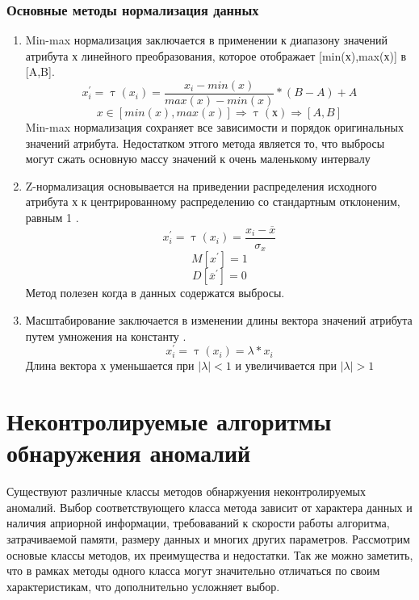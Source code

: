 \subsubsection{Основные методы нормализация данных}
\begin{enumerate}
	\item Min-max нормализация заключается в применении к диапазону значений атрибута х линейного преобразования, которое отображает [min(х),max(х)] в [A,B].
	\begin{equation}
	x^\prime_i=\uptau(x_i)=\frac{x_i - min(x)}{max(x) - min(x)}*(B-A) + A
		\end{equation}
   \begin{equation}
		x \in[min(x), max(x)] \Rightarrow \uptau(х) \Rightarrow [A,B]
	\end{equation}
	Min-max нормализация сохраняет все зависимости и порядок оригинальных значений атрибута. Недостатком этгого метода является то, что выбросы могут сжать основную массу значений к очень маленькому интервалу
	\item Z-нормализация  основывается на приведении распределения исходного атрибута х  к центрированному распределению со стандартным отклоненим, равным 1 \cite{Book06} .
	\begin{equation}
	x^\prime_i=\uptau(x_i) =\frac{x_i - \overline{x}}{\sigma_x}
		\end{equation}
		\begin{equation}
		M[x^\prime]=1	 
		\end{equation}
		\begin{equation}
		D[\overline{x}^\prime]=0	 
		\end{equation}
		Метод полезен когда в данных содержатся выбросы.
	\item Масштабирование заключается в изменении длины вектора значений атрибута путем умножения на константу \cite{Book06} .
	\begin{equation}
	x^\prime_i=\uptau(x_i)=\lambda*x_i
	\end{equation}
	Длина вектора х уменьшается при $|\lambda|<1$ и увеличивается при $|\lambda|>1$ 
\end{enumerate}
\section{Неконтролируемые алгоритмы обнаружения аномалий}
Существуют различные классы методов обнаржуения неконтролируемых аномалий. Выбор соответствующего класса метода зависит от характера данных и наличия априорной информации, требоваваний к скорости работы алгоритма, затрачиваемой памяти, размеру данных и многих других параметров. Рассмотрим основые классы методов, их преимущества и недостатки. Так же можно заметить, что в рамках методы одного класса могут значительно отличаться по своим характеристикам, что дополнительно усложняет выбор.
